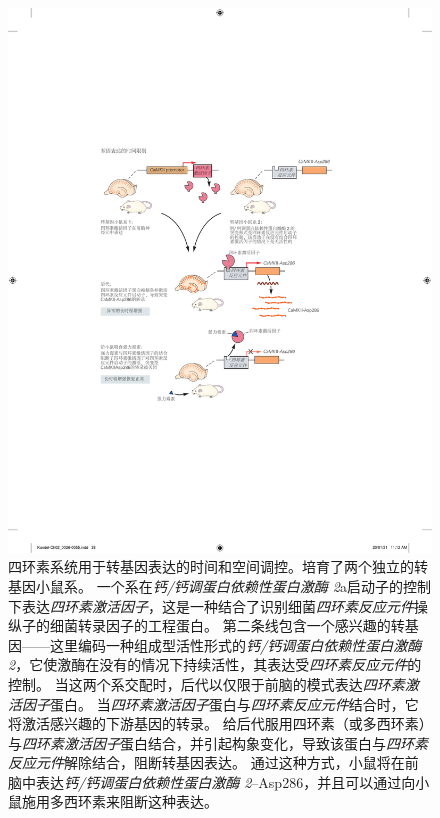 \begin{figure}[htbp]
	\centering
	\includegraphics[width=0.85\linewidth]{chap02/fig_2_9}
	\caption{四环素系统用于转基因表达的时间和空间调控。培育了两个独立的转基因小鼠系。
		一个系在\textit{钙/钙调蛋白依赖性蛋白激酶 2}a启动子的控制下表达\textit{四环素激活因子}，这是一种结合了识别细菌\textit{四环素反应元件}操纵子的细菌转录因子的工程蛋白。
		第二条线包含一个感兴趣的转基因——这里编码一种组成型活性形式的\textit{钙/钙调蛋白依赖性蛋白激酶 2}，它使激酶在没有的情况下持续活性，其表达受\textit{四环素反应元件}的控制。
		当这两个系交配时，后代以仅限于前脑的模式表达\textit{四环素激活因子}蛋白。
		当\textit{四环素激活因子}蛋白与\textit{四环素反应元件}结合时，它将激活感兴趣的下游基因的转录。
		给后代服用四环素（或多西环素）与\textit{四环素激活因子}蛋白结合，并引起构象变化，导致该蛋白与\textit{四环素反应元件}解除结合，阻断转基因表达。
		通过这种方式，小鼠将在前脑中表达\textit{钙/钙调蛋白依赖性蛋白激酶 2}–Asp286，并且可以通过向小鼠施用多西环素来阻断这种表达\cite{mayford1996control}。}
	\label{fig:2_9}
\end{figure}


